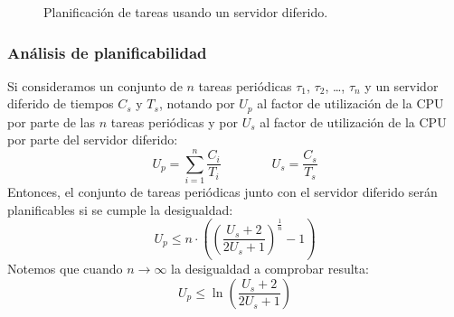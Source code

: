 \begin{ejemplo}
\begin{figure}[H]
        \caption{Planificación de tareas usando un servidor diferido.}
        \label{fig:serv_dif}
    \end{figure}
\end{ejemplo}

\subsubsection{Análisis de planificabilidad}
Si consideramos un conjunto de $n$ tareas periódicas $\tau_1$, $\tau_2$, \ldots, $\tau_n$ y un servidor diferido de tiempos $C_s$ y $T_s$, notando por $U_p$ al factor de utilización de la CPU por parte de las $n$ tareas periódicas y por $U_s$ al factor de utilización de la CPU por parte del servidor diferido:
\begin{equation*}
    U_p = \sum_{i=1}^{n} \dfrac{C_i}{T_i} \qquad \qquad  U_s = \dfrac{C_s}{T_s}
\end{equation*}
Entonces, el conjunto de tareas periódicas junto con el servidor diferido serán planificables si se cumple la desigualdad:
\begin{equation*}
    U_p \leq n \cdot \left({\left(\dfrac{U_s+2}{2U_s+1}\right)}^{\frac{1}{n}}-1\right)
\end{equation*}
Notemos que cuando $n\rightarrow\infty$ la desigualdad a comprobar resulta:
\begin{equation*}
    U_p \leq \ln\left(\dfrac{U_s+2}{2U_s+1}\right)
\end{equation*}
